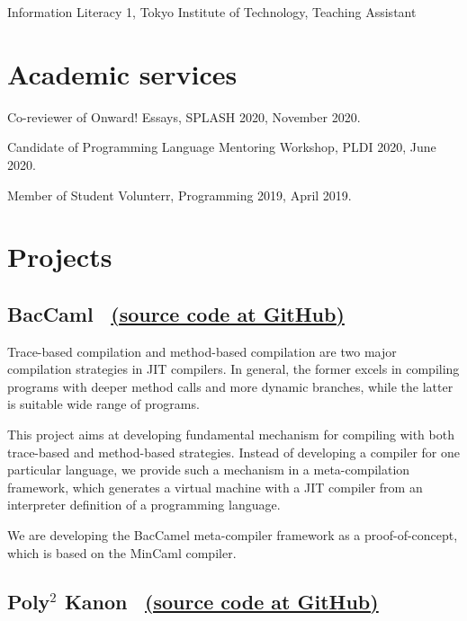 \documentclass[11pt]{article} %
\newcommand{\伊澤侑祐}{\underline{伊澤侑祐}}
\newcommand{\jit}{\textsc{JIT} }
\begin{document}
 Information Literacy 1, Tokyo Institute of Technology, Teaching Assistant


\section*{Academic services}

 Co-reviewer of Onward! Essays, SPLASH 2020, November 2020.

 Candidate of Programming Language Mentoring Workshop, PLDI 2020, June 2020.

 Member of Student Volunterr, Programming 2019, April 2019.

\section*{Projects}

\subsection*{BacCaml \, \href{https://github.com/prg-titech/baccaml}{(source code at GitHub)}}

\medskip

Trace-based compilation and method-based compilation are two major compilation
strategies in \jit compilers. In general, the former excels in  compiling
programs with deeper method calls and more dynamic branches, while  the latter
is suitable wide range of programs.

\medskip

This project aims at developing fundamental mechanism for compiling with both
trace-based and method-based strategies. Instead of developing  a compiler for
one particular language, we provide such a mechanism in a meta-compilation
framework, which generates a virtual machine with a \jit compiler from an
interpreter definition of a programming language.

\medskip

We are developing the BacCamel meta-compiler framework as a proof-of-concept,
which is based on the MinCaml compiler.

\medskip

\subsection*{Poly$^2$ Kanon \,
  \href{https://github.com/prg-titech/Kanon}{(source code at GitHub)}}
\end{document}
